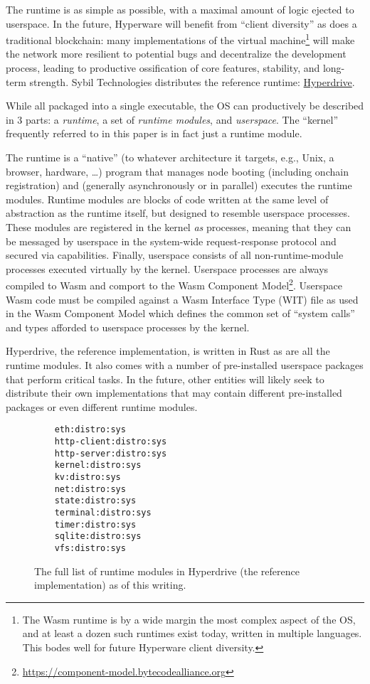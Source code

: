 \documentclass[runningheads]{llncs}
\begin{document}
The runtime is as simple as possible, with a maximal amount of logic ejected to userspace.
In the future, Hyperware will benefit from ``client diversity'' as does a traditional blockchain: many implementations of the virtual machine\footnote{The Wasm runtime is by a wide margin the most complex aspect of the OS, and at least a dozen such runtimes exist today, written in multiple languages.
This bodes well for future Hyperware client diversity.}
will make the network more resilient to potential bugs and decentralize the development process, leading to productive ossification of core features, stability, and long-term strength.
Sybil Technologies distributes the reference runtime: \href{https://github.com/hyperware-ai/hyperdrive}{Hyperdrive}.

While all packaged into a single executable, the OS can productively be described in 3 parts: a \textit{runtime}, a set of \textit{runtime modules}, and \textit{userspace}.
The ``kernel'' frequently referred to in this paper is in fact just a runtime module.

The runtime is a ``native'' (to whatever architecture it targets, e.g., Unix, a browser, hardware, \ldots) program that manages node booting (including onchain registration) and (generally asynchronously or in parallel) executes the runtime modules.
Runtime modules are blocks of code written at the same level of abstraction as the runtime itself, but designed to resemble userspace processes.
These modules are registered in the kernel \textit{as} processes, meaning that they can be messaged by userspace in the system-wide request-response protocol and secured via capabilities.
Finally, userspace consists of all non-runtime-module processes executed virtually by the kernel.
Userspace processes are always compiled to Wasm and comport to the Wasm Component Model\footnote{\url{https://component-model.bytecodealliance.org}}.
Userspace Wasm code must be compiled against a Wasm Interface Type (WIT) file as used in the Wasm Component Model which defines the common set of ``system calls'' and types afforded to userspace processes by the kernel.

Hyperdrive, the reference implementation, is written in Rust as are all the runtime modules.
It also comes with a number of pre-installed userspace packages that perform critical tasks.
In the future, other entities will likely seek to distribute their own implementations that may contain different pre-installed packages or even different runtime modules.

\begin{figure}
    \centering
    \begin{verbatim}
    eth:distro:sys
    http-client:distro:sys
    http-server:distro:sys
    kernel:distro:sys
    kv:distro:sys
    net:distro:sys
    state:distro:sys
    terminal:distro:sys
    timer:distro:sys
    sqlite:distro:sys
    vfs:distro:sys
    \end{verbatim}
    \caption{The full list of runtime modules in Hyperdrive (the reference implementation) as of this writing.}
    \label{fig:runtime modules list}
\end{figure}
\end{document}
